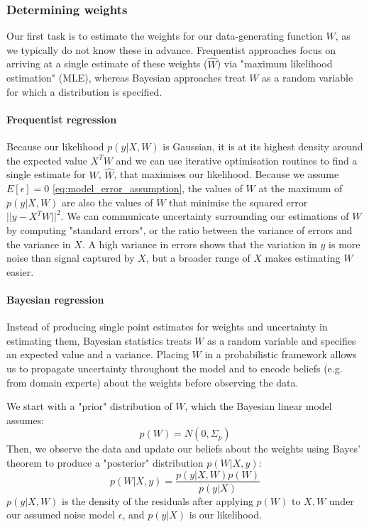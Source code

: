\subsubsection{Determining weights}
Our first task is to estimate the weights for our data-generating function $W$, as we typically do not know these in advance. Frequentist approaches focus on arriving at a single estimate of these weights ($\hat{W}$) via "maximum likelihood estimation" (MLE), whereas Bayesian approaches treat $W$ as a random variable for which a distribution is specified.

\paragraph{Frequentist regression}
Because our likelihood $p(y|X,W)$ is Gaussian, it is at its highest density around the expected value $X^TW$ and we can use iterative optimisation routines to find a single estimate for $W$, $\hat{W}$, that maximises our likelihood. Because we assume $E[\epsilon] = 0$ \ref{eq:model_error_assumption}, the values of $W$ at the maximum of $p(y|X,W)$ are also the values of $W$ that minimise the squared error $||y - X^TW||^2$. We can communicate uncertainty surrounding our estimations of $W$ by computing "standard errors", or the ratio between the variance of errors and the variance in $X$. A high variance in errors shows that the variation in $y$ is more noise than signal captured by $X$, but a broader range of $X$ makes estimating $W$ easier.

\paragraph{Bayesian regression}
Instead of producing single point estimates for weights and uncertainty in estimating them, Bayesian statistics treats $W$ as a random variable and specifies an expected value and a variance. Placing $W$ in a probabilistic framework allows us to propagate uncertainty throughout the model and to encode beliefs (e.g. from domain experts) about the weights before observing the data.

We start with a "prior" distribution of $W$, which the Bayesian linear model assumes:
\begin{equation} \label{eq:prior_distribution}
    p(W) = N(0, \Sigma_p)
\end{equation}
Then, we observe the data and update our beliefs about the weights using Bayes' theorem to produce a "posterior" distribution $p(W|X,y)$:
\begin{equation*}
    p(W|X,y) = \frac{p(y|X,W)p(W)}{p(y|X)}
\end{equation*}
$p(y|X,W)$ is the density of the residuals after applying $p(W)$ to $X,W$ under our assumed noise model $\epsilon$, and $p(y|X)$ is our likelihood.

